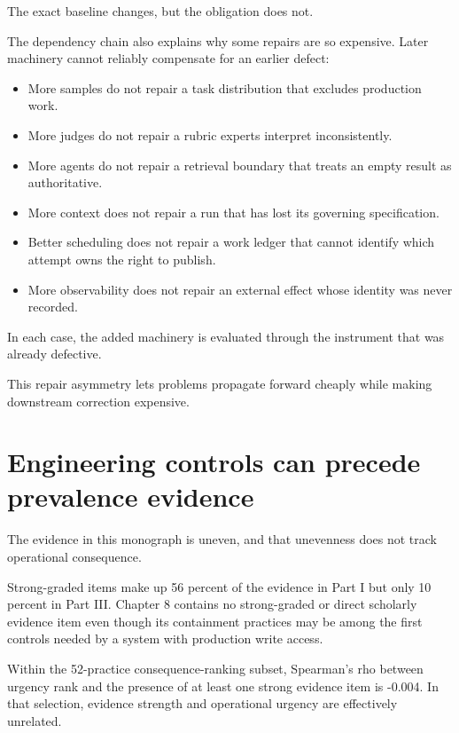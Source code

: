 The exact baseline changes, but the obligation does not.

The dependency chain also explains why some repairs are so expensive. Later machinery cannot reliably compensate for an earlier defect:

\begin{itemize}
\tightlist
\item
  More samples do not repair a task distribution that excludes production work.
\item
  More judges do not repair a rubric experts interpret inconsistently.
\item
  More agents do not repair a retrieval boundary that treats an empty result as authoritative.
\item
  More context does not repair a run that has lost its governing specification.
\item
  Better scheduling does not repair a work ledger that cannot identify which attempt owns the right to publish.
\item
  More observability does not repair an external effect whose identity was never recorded.
\end{itemize}

In each case, the added machinery is evaluated through the instrument that was already defective.

This repair asymmetry lets problems propagate forward cheaply while making downstream correction expensive.

\hypertarget{engineering-controls-can-precede-prevalence-evidence}{%
\section{Engineering controls can precede prevalence evidence}\label{engineering-controls-can-precede-prevalence-evidence}}

The evidence in this monograph is uneven, and that unevenness does not track operational consequence.

Strong-graded items make up 56 percent of the evidence in Part I but only 10 percent in Part III. Chapter 8 contains no strong-graded or direct scholarly evidence item even though its containment practices may be among the first controls needed by a system with production write access.

Within the 52-practice consequence-ranking subset, Spearman's rho between urgency rank and the presence of at least one strong evidence item is -0.004. In that selection, evidence strength and operational urgency are effectively unrelated.

